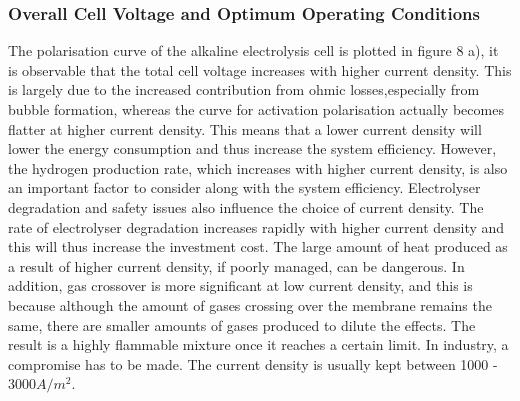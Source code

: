 \subsubsection{Overall Cell Voltage and Optimum Operating Conditions}
The polarisation curve of the alkaline electrolysis cell is plotted in figure 8 a), it is observable that the total cell voltage increases with higher current density. This is largely due to the increased contribution from ohmic losses,especially from bubble formation, whereas the curve for activation polarisation actually becomes flatter at higher current density. This means that a lower current density will lower the energy consumption and thus increase the system efficiency. However, the hydrogen production rate, which increases with higher current density,  is also an important factor to consider along with the system efficiency.  Electrolyser degradation and safety issues also influence the choice of current density. The rate of electrolyser degradation increases rapidly with higher current density and this will thus increase the investment cost. The large amount of heat produced as a result of higher current density, if poorly managed, can be dangerous. In addition, gas crossover is more significant at low current density, and this is because although the amount of gases crossing over the membrane remains the same, there are smaller amounts of gases produced to dilute the effects. The result is a highly flammable mixture once it reaches a certain limit. In industry, a compromise has to be made. The current density is usually kept between 1000 - 3000$A/m^2$. \cite{currentdensity}\cite{currentdensity2}

